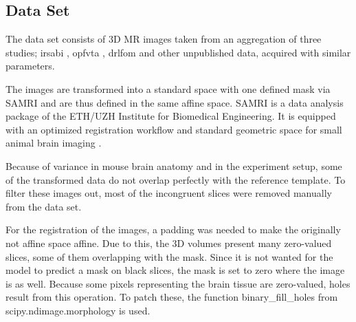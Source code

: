 \subsection{Data Set}
The data set consists of 3D MR images taken from an aggregation of three studies; irsabi , opfvta \cite{ioanas_whole-brain_nodate}, drlfom \cite{ioanas_effects_nodate} and other unpublished data, acquired with similar parameters.

The images are transformed into a standard space with one defined mask via SAMRI \cite{noauthor_ibt-fmi/samri_2019} and are thus defined in the same affine space.
SAMRI is a data analysis package of the ETH/UZH Institute for Biomedical Engineering.
It is equipped with an optimized registration workflow and standard geometric space for small animal brain imaging \cite{ioanas_optimized_2019}.

Because of variance in mouse brain anatomy and in the experiment setup, some of the transformed data do not overlap perfectly with the reference template.
To filter these images out, most of the incongruent slices were removed manually from the data set.

For the registration of the images, a padding was needed to make the originally not affine space affine. 
Due to this, the 3D volumes present many zero-valued slices, some of them overlapping with the mask.
Since it is not wanted for the model to predict a mask on black slices, the mask is set to zero where the image is as well.
Because some pixels representing the brain tissue are zero-valued, holes result from this operation.
To patch these, the function binary\_fill\_holes from scipy.ndimage.morphology \cite{noauthor_multi-dimensional_nodate} is used.


